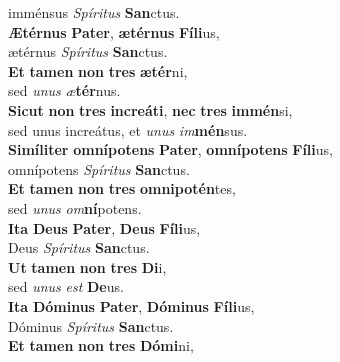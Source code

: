\oddverse imménsus \textit{Spí}\textit{ri}\textit{tus} \textbf{San}ctus.\\
\evenverse \textbf{Æ}\textbf{tér}\textbf{nus} \textbf{Pa}\textbf{ter}, \textbf{æ}\textbf{tér}\textbf{nus} \textbf{Fí}\textbf{li}us,~\*\\
\evenverse ætérnus \textit{Spí}\textit{ri}\textit{tus} \textbf{San}ctus.\\
\oddverse \textbf{Et} \textbf{ta}\textbf{men} \textbf{non} \textbf{tres} \textbf{æ}\textbf{tér}ni,~\*\\
\oddverse sed \textit{u}\textit{nus} \textit{æ}\textbf{tér}nus.\\
\evenverse \textbf{Si}\textbf{cut} \textbf{non} \textbf{tres} \textbf{in}\textbf{cre}\textbf{á}\textbf{ti}, \textbf{nec} \textbf{tres} \textbf{im}\textbf{mén}si,~\*\\
\evenverse sed unus increátus, et \textit{u}\textit{nus} \textit{im}\textbf{mén}sus.\\
\oddverse \textbf{Si}\textbf{mí}\textbf{li}\textbf{ter} \textbf{om}\textbf{ní}\textbf{po}\textbf{tens} \textbf{Pa}\textbf{ter}, \textbf{om}\textbf{ní}\textbf{po}\textbf{tens} \textbf{Fí}\textbf{li}us,~\*\\
\oddverse omnípotens \textit{Spí}\textit{ri}\textit{tus} \textbf{San}ctus.\\
\evenverse \textbf{Et} \textbf{ta}\textbf{men} \textbf{non} \textbf{tres} \textbf{om}\textbf{ni}\textbf{po}\textbf{tén}tes,~\*\\
\evenverse sed \textit{u}\textit{nus} \textit{om}\textbf{ní}potens.\\
\oddverse \textbf{I}\textbf{ta} \textbf{De}\textbf{us} \textbf{Pa}\textbf{ter}, \textbf{De}\textbf{us} \textbf{Fí}\textbf{li}us,~\*\\
\oddverse Deus \textit{Spí}\textit{ri}\textit{tus} \textbf{San}ctus.\\
\evenverse \textbf{Ut} \textbf{ta}\textbf{men} \textbf{non} \textbf{tres} \textbf{Di}i,~\*\\
\evenverse sed \textit{u}\textit{nus} \textit{est} \textbf{De}us.\\
\oddverse \textbf{I}\textbf{ta} \textbf{Dó}\textbf{mi}\textbf{nus} \textbf{Pa}\textbf{ter}, \textbf{Dó}\textbf{mi}\textbf{nus} \textbf{Fí}\textbf{li}us,~\*\\
\oddverse Dóminus \textit{Spí}\textit{ri}\textit{tus} \textbf{San}ctus.\\
\evenverse \textbf{Et} \textbf{ta}\textbf{men} \textbf{non} \textbf{tres} \textbf{Dó}\textbf{mi}ni,~\*\\
